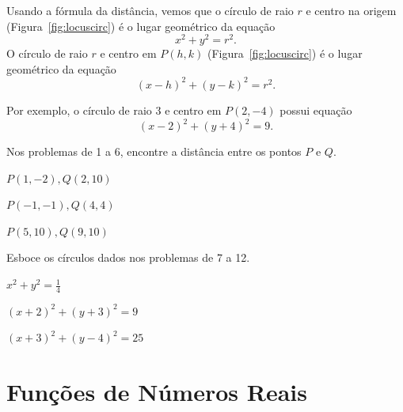 Usando a fórmula da distância, vemos que o círculo de raio $r$ e centro na
origem (Figura~\ref{fig:locuscirc}) é o lugar geométrico da equação
\[
	x^2 + y^2 = r^2.
\]
O círculo de raio $r$ e centro em $P(h,k)$ (Figura~\ref{fig:locuscirc}) é
o lugar geométrico da equação
\[
	(x-h)^2 + (y-k)^2 = r^2.
\]


Por exemplo, o círculo de raio $3$ e centro em $P(2,-4)$ possui equação
\[
	(x-2)^2 + (y+4)^2 = 9.
\]

\begin{sectionproblems}


\noindent Nos problemas de 1 a 6, encontre a distância entre
          os pontos $P$ e $Q$.

%
        {$P(1,-2),  Q( 2,10)$}

%
        {$P(-1,-1), Q( 4, 4)$}

%
        {$P(5,10),  Q( 9,10)$}

\noindent Esboce os círculos dados nos problemas de 7 a 12.

%
        {$x^2 + y^2 = \frac{1}{4}$}

%
        {$(x+2)^2 + (y+3)^2 = 9$}

%
        {$(x+3)^2 + (y-4)^2 = 25$}






\end{sectionproblems}

\section{Funções de Números Reais}
\label{sec:funcreal}

